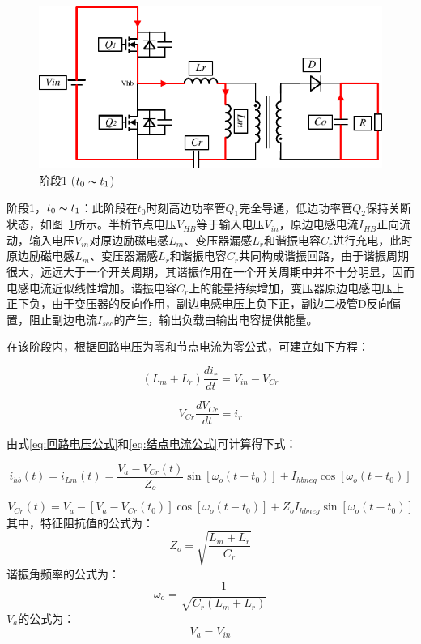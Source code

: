 \begin{figure}[htbp] 
    \centering
    \includegraphics[width=0.6\linewidth]{figures/工作原理1.pdf}
    \caption{阶段1 ($t_0 \thicksim t_1$)}
    \label{fig:工作原理1}
\end{figure}
                
阶段1，$t_0 \thicksim t_1$：此阶段在$t_0$时刻高边功率管$Q_1$完全导通，低边功率管$Q_2$保持关断状态，如图~\ref{fig:工作原理1}所示。半桥节点电压$V_{HB}$等于输入电压$V_{in}$，原边电感电流$I_{HB}$正向流动，输入电压$V_{in}$对原边励磁电感$L_m$、变压器漏感$L_r$和谐振电容$C_r$进行充电，此时原边励磁电感$L_m$、变压器漏感$L_r$和谐振电容$C_r$共同构成谐振回路，由于谐振周期很大，远远大于一个开关周期，其谐振作用在一个开关周期中并不十分明显，因而电感电流近似线性增加。谐振电容$C_r$上的能量持续增加，变压器原边电感电压上正下负，由于变压器的反向作用，副边电感电压上负下正，副边二极管D反向偏置，阻止副边电流$I_{sec}$的产生，输出负载由输出电容提供能量。

在该阶段内，根据回路电压为零和节点电流为零公式，可建立如下方程：

\begin{equation}
    \label{eq:回路电压公式}
    (L_m + L_r)\frac{di_r}{dt} = V_{in} - V_{Cr}  
\end{equation}

\begin{equation}
    \label{eq:结点电流公式}
    V_{Cr}\frac{dV_{Cr}}{dt} = i_r 
\end{equation}

由式\eqref{eq:回路电压公式}和\eqref{eq:结点电流公式}可计算得下式：

\begin{equation}
    \label{eq:Ihb公式1}
    i_{hb}(t) = i_{Lm}(t) = \frac{V_{a}-V_{Cr}(t)}{Z_o}\sin[\omega_o(t-t_0)] + I_{hbneg}\cos[\omega_o(t-t_0)]  
\end{equation}

\begin{equation}
    \label{eq:Vcr公式}
    V_{Cr}(t) =V_{a}-[V_{a}-V_{Cr}(t_0)]\cos[\omega_o(t-t_0)] + {Z_o} I_{hbneg} \sin[\omega_o(t-t_0)]
\end{equation}
其中，特征阻抗值的公式为：
\begin{equation}
    \label{eq:Zo公式}
    Z_o=\sqrt{\frac{L_m+L_r}{C_r}}  
\end{equation}
谐振角频率的公式为：
\begin{equation}
    \label{eq:omega_o公式}
    \omega_o=\frac{1}{\sqrt{C_r(L_m+L_r)}}
\end{equation}
$V_{a}$的公式为：
\begin{equation}
    \label{eq:Vhb公式1}
    V_{a}=V_{in}
\end{equation}

